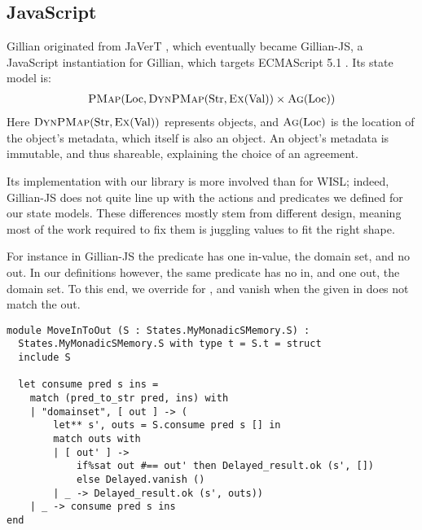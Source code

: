 \subsection{JavaScript}

Gillian originated from JaVerT \cite{javert1,javert2}, which eventually became Gillian-JS, a JavaScript instantiation for Gillian, which targets ECMAScript 5.1 \cite{ecmascript}. Its state model is: \begin{align*}
	\textsc{PMap}(\text{Loc}, \textsc{DynPMap}(\text{Str}, \textsc{Ex}(\text{Val})) \times \textsc{Ag}(\text{Loc}))
\end{align*}
Here $\textsc{DynPMap}(\text{Str}, \textsc{Ex}(\text{Val}))$ represents objects, and $\textsc{Ag}(\text{Loc})$ is the location of the object's metadata, which itself is also an object. An object's metadata is immutable, and thus shareable, explaining the choice of an agreement.

Its implementation with our library is more involved than for WISL; indeed, Gillian-JS does not quite line up with the actions and predicates we defined for our state models. These differences mostly stem from different design, meaning most of the work required to fix them is juggling values to fit the right shape.

For instance in Gillian-JS the \domainset{} predicate has one in-value, the domain set, and no out. In our definitions however, the same predicate has no in, and one out, the domain set. To this end, we override \consume{} for \domainset{}, and vanish when the given in does not match the out.
\begin{lstlisting}
module MoveInToOut (S : States.MyMonadicSMemory.S) :
  States.MyMonadicSMemory.S with type t = S.t = struct
  include S

  let consume pred s ins =
    match (pred_to_str pred, ins) with
    | "domainset", [ out ] -> (
        let** s', outs = S.consume pred s [] in
        match outs with
        | [ out' ] ->
            if%sat out #== out' then Delayed_result.ok (s', [])
            else Delayed.vanish ()
        | _ -> Delayed_result.ok (s', outs))
    | _ -> consume pred s ins
end
\end{lstlisting}


